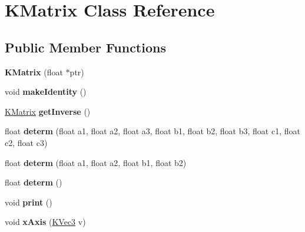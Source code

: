 \hypertarget{class_k_matrix}{
\section{KMatrix Class Reference}
\label{class_k_matrix}
}
\subsection*{Public Member Functions}
\begin{DoxyCompactItemize}
\item 
\hypertarget{class_k_matrix_af2f01b23f1f5d4d36e007ef5b29b5ace}{
{\bfseries KMatrix} (float $\ast$ptr)}
\label{class_k_matrix_af2f01b23f1f5d4d36e007ef5b29b5ace}

\item 
\hypertarget{class_k_matrix_a581c99d6e72bad0c5ad9ca68198347a3}{
void {\bfseries makeIdentity} ()}
\label{class_k_matrix_a581c99d6e72bad0c5ad9ca68198347a3}

\item 
\hypertarget{class_k_matrix_ab1d120c7ef0582bae032d474e48ddd51}{
\hyperlink{class_k_matrix}{KMatrix} {\bfseries getInverse} ()}
\label{class_k_matrix_ab1d120c7ef0582bae032d474e48ddd51}

\item 
\hypertarget{class_k_matrix_ac5e2411cea8bfa9de335c4215d341768}{
float {\bfseries determ} (float a1, float a2, float a3, float b1, float b2, float b3, float c1, float c2, float c3)}
\label{class_k_matrix_ac5e2411cea8bfa9de335c4215d341768}

\item 
\hypertarget{class_k_matrix_ac4f98e02c45ac973ca39a3ff8ce14548}{
float {\bfseries determ} (float a1, float a2, float b1, float b2)}
\label{class_k_matrix_ac4f98e02c45ac973ca39a3ff8ce14548}

\item 
\hypertarget{class_k_matrix_a657a51b04b7e7085a01a585f641bd8bc}{
float {\bfseries determ} ()}
\label{class_k_matrix_a657a51b04b7e7085a01a585f641bd8bc}

\item 
\hypertarget{class_k_matrix_a60a18c89d0deaf1b9761aa655659805d}{
void {\bfseries print} ()}
\label{class_k_matrix_a60a18c89d0deaf1b9761aa655659805d}

\item 
\hypertarget{class_k_matrix_ac15aa9b651a34209b06200be0d59a096}{
void {\bfseries xAxis} (\hyperlink{class_k_vec3}{KVec3} v)}
\label{class_k_matrix_ac15aa9b651a34209b06200be0d59a096}


\end{DoxyCompactItemize}
